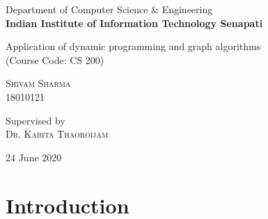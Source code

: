 \documentclass[14pt,a4]{extreport}
\begin{document}
\begin{centering}
\vspace{1cm}
\Large{Department of Computer Science \& Engineering}\\ 
{\bf \LARGE Indian Institute of Information Technology Senapati}\\
\vspace{6cm}

{\huge Application of dynamic programming and graph algorithms}\\
{(Course Code: CS 200)}\\
\vspace{4cm}
{\textsc{\Large Shivam Sharma} \\ 18010121\par}
\vspace{4cm}
Supervised by\\
\textsc{Dr. Kabita Thaoroijam} \par

\vfill
24 June 2020
\end{centering}


\begin{abstract}
Shortest path algorithms have many applications.Mapping software like Google or Apple maps makes use of shortest path algorithms.  They are also important for road network, operations, and logistics research.  Shortest path algorithms are also very important for computer networks, like the Internet.Shortest path algorithms have wide applications and so wide are no of algorithms to find shortest path.We always uses the google maps etc. to find shortest path while going from one place to another.This project will analyse how the maps actually finds the path using shortest path algorithms.In this we will analyse the time taken by different algorithms in finding the shortest path from source node to destination node.But the most important factor among all such algorithms are time and space complexity of  the  algorithms.We  always  want  to  use  system  which  gives  us  faster  results.
\end{abstract}



\chapter{Introduction}
\end{document}
